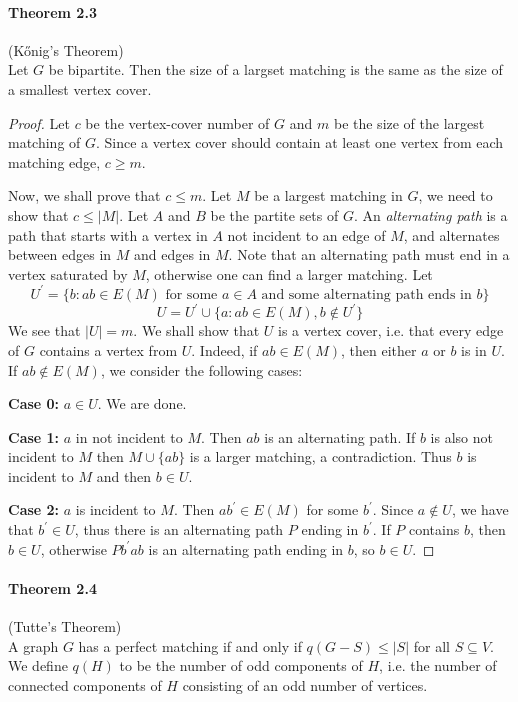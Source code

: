 \paragraph{Theorem 2.3} (K\H{o}nig's Theorem) \\
Let $ G $ be bipartite. Then the size of a largset matching is the same as the 
size of a smallest vertex cover.
\begin{proof}
   Let $ c $ be the vertex-cover number of $ G $ and $ m $ be the size of the 
   largest matching of $ G$. Since a vertex cover should contain at least one 
   vertex from each matching edge, $ c \geq m $. 

   \smallskip \noindent
   Now, we shall prove that $ c \leq m$. Let $ M $ be a largest matching in $ G $,
   we need to show that $ c \leq |M|$. Let $ A $ and $ B $ be the partite sets of $ G$.
   An \textit{alternating path} is a path that starts with a vertex in $ A $ not incident
   to an edge of $ M $, and alternates between edges in $ M $ and edges in $ M$.
   Note that an alternating path must end in a vertex saturated by $ M $, otherwise one 
   can find a larger matching. Let 
   $$ U^\prime = \{b: ab \in E(M) \text{ for some } a \in A 
   \text{ and some alternating path ends in } b\} $$
   $$ U = U^\prime \cup \{a: ab \in E(M), b \notin U^\prime\} $$
   We see that $ |U| = m$. We shall show that $ U $ is a vertex cover, i.e. that every
   edge of $ G $ contains a vertex from $ U$. Indeed, if $ ab \in E(M) $, then either 
   $ a $ or $ b $ is in $ U $. If $ ab \notin E(M) $, we consider the following cases:

   \bigskip \noindent
   \textbf{Case 0:} $ a \in U $. We are done.

   \smallskip \noindent
   \textbf{Case 1:} $ a $ in not incident to $ M$. Then $ ab $ is an alternating path.
   If $ b $ is also not incident to $ M $ then $ M \cup \{ab\} $ is a larger matching, 
   a contradiction. Thus $ b $ is incident to $ M $ and then $ b \in U $.

   \smallskip \noindent
   \textbf{Case 2:} $ a $ is incident to $ M$. Then $ ab^\prime \in E(M) $ for some 
   $ b^\prime$. Since $ a \notin U$, we have that $ b^\prime \in U$, thus there is 
   an alternating path $ P $ ending in $ b^\prime$. If $ P $ contains $ b$, then 
   $ b \in U$, otherwise $ Pb^{\prime}ab $ is an alternating path ending in  
   $ b $, so $ b \in U$.

\end{proof}

\paragraph{Theorem 2.4} (Tutte's Theorem) \\
A graph $ G $ has a perfect matching if and only if $ q(G - S) \leq |S| $ for all 
$ S \subseteq V $. We define $ q(H) $ to be the number of odd components of $ H $,
i.e. the number of connected components of $ H $ consisting of an odd number of 
vertices.